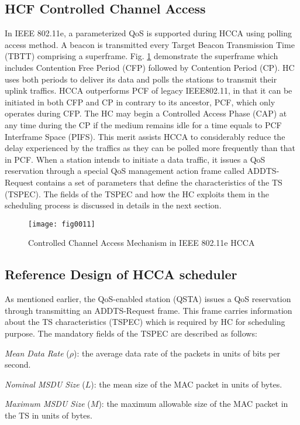 \documentclass[a4paper, conference]{IEEEtran}
\begin{document}
\subsection{HCF Controlled Channel Access}
In IEEE 802.11e, a parameterized QoS is supported during HCCA using polling access method. A beacon is transmitted every Target Beacon Transmission Time (TBTT) comprising a superframe. Fig. \ref{fig001} demonstrate the superframe which includes Contention Free Period (CFP) followed by Contention Period (CP). HC uses both periods to deliver its data and polls the stations to transmit their uplink traffics. HCCA outperforms PCF of legacy IEEE802.11, in that it can be initiated in both CFP and CP in contrary to its ancestor, PCF, which only operates during  CFP. The HC may begin a Controlled Access Phase (CAP) at any time during the CP if the medium remains idle for a time equals to PCF Interframe Space (PIFS). This merit assists HCCA to considerably reduce the delay experienced by the traffics as they can be polled more frequently than that in PCF. When a station intends to initiate a data traffic, it issues a QoS reservation through a special QoS management action frame called ADDTS-Request contains a set of parameters that define the characteristics of the TS (TSPEC). The fields of the TSPEC and how the HC exploits them in the scheduling process is discussed in details in the next section.
\begin{figure}[hbtp]
\centering
\texttt{[image: fig0011]}
\caption{Controlled Channel Access Mechanism in IEEE 802.11e HCCA}
\label{fig001}
\end{figure}
\subsection{Reference Design of HCCA scheduler}
\label{sec:HCCA}
As mentioned earlier, the QoS-enabled station (QSTA) issues a QoS reservation through transmitting an ADDTS-Request frame. This frame carries information about the TS characteristics (TSPEC) which is required by HC for scheduling purpose. The mandatory fields of the TSPEC are described as follows:

\textit{Mean Data Rate} ($\rho$): the average data rate of the packets in units of bits per second.

\textit{Nominal MSDU Size} ($L$): the mean size of the MAC packet in units of bytes.

\textit{Maximum MSDU Size} ($M$): the maximum allowable size of the MAC packet in the TS in units of bytes.
\end{document}
